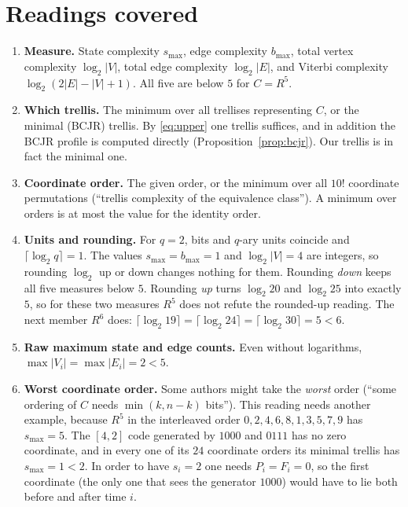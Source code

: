 \documentclass[11pt]{article}
\theoremstyle{definition}
\theoremstyle{remark}
\newcommand{\smax}{s_{\max}}
\begin{document}
\section{Readings covered}\label{sec:readings}
\begin{enumerate}
\item[(a)] \textbf{Measure.} State complexity $\smax$, edge complexity $b_{\max}$, total
vertex complexity $\log_2|V|$, total edge complexity $\log_2|E|$, and Viterbi complexity
$\log_2(2|E|-|V|+1)$. All five are below $5$ for $C=R^5$.
\item[(b)] \textbf{Which trellis.} The minimum over all trellises representing $C$, or the
minimal (BCJR) trellis. By \eqref{eq:upper} one trellis suffices, and in addition the BCJR
profile is computed directly (Proposition~\ref{prop:bcjr}). Our trellis is in fact the
minimal one.
\item[(c)] \textbf{Coordinate order.} The given order, or the minimum over all $10!$
coordinate permutations (``trellis complexity of the equivalence class''). A minimum
over orders is at most the value for the identity order.
\item[(d)] \textbf{Units and rounding.} For $q=2$, bits and $q$-ary units coincide and
$\lceil\log_2 q\rceil=1$. The values $\smax=b_{\max}=1$ and $\log_2|V|=4$ are integers, so
rounding $\log_2$ up or down changes nothing for them. Rounding \emph{down} keeps all five
measures below $5$. Rounding \emph{up} turns $\log_2 20$ and $\log_2 25$ into exactly $5$, so
for these two measures $R^5$ does not refute the rounded-up reading. The next member $R^6$
does: $\lceil\log_2 19\rceil=\lceil\log_2 24\rceil=\lceil\log_2 30\rceil=5<6$.
\item[(e)] \textbf{Raw maximum state and edge counts.} Even without logarithms,
$\max|V_i|=\max|E_i|=2<5$.
\item[(f)] \textbf{Worst coordinate order.} Some authors might take the
\emph{worst} order (``some ordering of $C$ needs $\min(k,n-k)$ bits''). This reading needs
another example, because $R^5$ in the interleaved order $0,2,4,6,8,1,3,5,7,9$ has
$\smax=5$. The $[4,2]$ code generated by $1000$ and $0111$ has no zero coordinate, and
in every one of its $24$ coordinate orders its minimal trellis has $\smax=1<2$. In order to
have $s_i=2$ one needs $P_i=F_i=0$, so the first coordinate (the only one that
sees the generator $1000$) would have to lie both before and after time $i$.
\end{enumerate}
\end{document}

